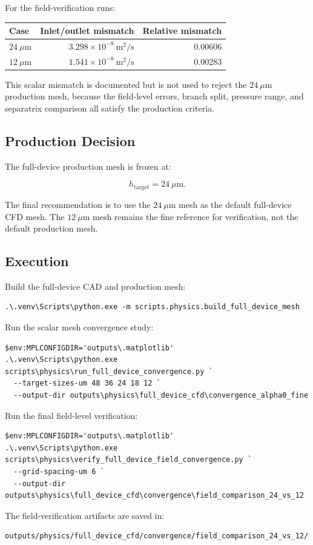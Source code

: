For the field-verification runs:

\begin{center}
\begin{tabular}{lrr}
\toprule
Case & Inlet/outlet mismatch & Relative mismatch \\
\midrule
\(24~\mu\mathrm{m}\) & \(3.298\times10^{-8}~\mathrm{m^2/s}\) & 0.00606 \\
\(12~\mu\mathrm{m}\) & \(1.541\times10^{-8}~\mathrm{m^2/s}\) & 0.00283 \\
\bottomrule
\end{tabular}
\end{center}

This scalar mismatch is documented but is not used to reject the
\(24~\mu\mathrm{m}\) production mesh, because the field-level errors, branch
split, pressure range, and separatrix comparison all satisfy the production
criteria.

\subsection{Production Decision}

The full-device production mesh is frozen at:

\[
\boxed{h_{\mathrm{target}}=24~\mu\mathrm{m}.}
\]

The final recommendation is to use the \(24~\mu\mathrm{m}\) mesh as the default
full-device CFD mesh.  The \(12~\mu\mathrm{m}\) mesh remains the fine reference
for verification, not the default production mesh.

\subsection{Execution}

Build the full-device CAD and production mesh:

\begin{verbatim}
.\.venv\Scripts\python.exe -m scripts.physics.build_full_device_mesh
\end{verbatim}

Run the scalar mesh convergence study:

\begin{verbatim}
$env:MPLCONFIGDIR='outputs\.matplotlib'
.\.venv\Scripts\python.exe scripts\physics\run_full_device_convergence.py `
  --target-sizes-um 48 36 24 18 12 `
  --output-dir outputs\physics\full_device_cfd\convergence_alpha0_fine
\end{verbatim}

Run the final field-level verification:

\begin{verbatim}
$env:MPLCONFIGDIR='outputs\.matplotlib'
.\.venv\Scripts\python.exe scripts\physics\verify_full_device_field_convergence.py `
  --grid-spacing-um 6 `
  --output-dir outputs\physics\full_device_cfd\convergence\field_comparison_24_vs_12
\end{verbatim}

The field-verification artifacts are saved in:

\begin{verbatim}
outputs/physics/full_device_cfd/convergence/field_comparison_24_vs_12/
\end{verbatim}

